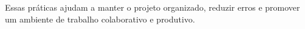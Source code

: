 Essas práticas ajudam a manter o projeto organizado, reduzir erros e promover um ambiente de trabalho colaborativo e produtivo.











